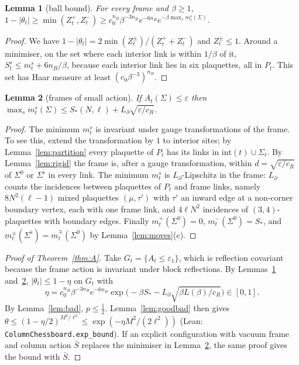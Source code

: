 \documentclass[11pt,a4paper]{article}
\newtheorem{lemma}{Lemma}[section]
\theoremstyle{definition}
\theoremstyle{remark}
\newcommand{\code}[1]{\texttt{#1}}
\begin{document}
\begin{lemma}[ball bound]\label{lem:ball}
For every frame and $\beta\ge1$, $1-|\theta_t|\ge\min(Z^+_t,Z^-_t)\ge c_0^{n_B}\beta^{-3n_B}e^{-6n_B}e^{-\beta\max_sm^s_t(\Sigma)}$.
\end{lemma}
\begin{proof}
We have $1-|\theta_t|=2\min(Z^\pm_t)/(Z^+_t+Z^-_t)$ and $Z^\pm_t\le1$.
Around a minimiser, on the set where each interior link is within $1/\beta$ of it, $S^s_t\le m^s_t+6n_B/\beta$, because each interior link lies in six plaquettes, all in $P_t$.
This set has Haar measure at least $(c_0\beta^{-3})^{n_B}$.
\end{proof}

\begin{lemma}[frames of small action]\label{lem:good}
If $A_t(\Sigma)\le\varepsilon$ then $\max_sm^s_t(\Sigma)\le S_*(N,\ell)+L_\partial\sqrt{\varepsilon/c_R}$.
\end{lemma}
\begin{proof}
The minimum $m^s_t$ is invariant under gauge transformations of the frame.
To see this, extend the transformation by $1$ to interior sites; by Lemma~\ref{lem:partition} every plaquette of $P_t$ has its links in $\mathrm{int}(t)\cup\Sigma_t$.
By Lemma~\ref{lem:rigid} the frame is, after a gauge transformation, within $d=\sqrt{\varepsilon/c_R}$ of $\Sigma^0$ or $\Sigma^\flat$ in every link.
The minimum $m^s_t$ is $L_\partial$-Lipschitz in the frame: $L_\partial$ counts the incidences between plaquettes of $P_t$ and frame links, namely $8N^2(\ell-1)$ mixed plaquettes $(\mu,\tau')$ with $\tau'$ an inward edge at a non-corner boundary vertex, each with one frame link, and $4\ell N^2$ incidences of $(3,4)$-plaquettes with boundary edges.
Finally $m^+_t(\Sigma^0)=0$, $m^-_t(\Sigma^0)=S_*$, and $m^\pm_t(\Sigma^\flat)=m^\mp_t(\Sigma^0)$ by Lemma~\ref{lem:moves}(c).
\end{proof}

\begin{proof}[Proof of Theorem~\ref{thm:A}]
Take $G_t=\{A_t\le\varepsilon_1\}$, which is reflection covariant because the frame action is invariant under block reflections. By Lemmas~\ref{lem:ball} and~\ref{lem:good}, $|\theta_t|\le1-\eta$ on $G_t$ with
\[ \eta=c_0^{n_B}\beta^{-3n_B}e^{-6n_B}\exp\big(-\beta S_*-L_\partial\sqrt{\beta L(\beta)/c_R}\big)\in[0,1]. \]
By Lemma~\ref{lem:bad}, $p\le\frac12$.
Lemma~\ref{lem:goodbad} then gives $\theta\le(1-\eta/2)^{M^2/\ell^2}\le\exp(-\eta M^2/(2\ell^2))$ (Lean: \code{ColumnChessboard.exp\_bound}). If an explicit configuration with vacuum frame and column action $\bar S$ replaces the minimiser in Lemma~\ref{lem:good}, the same proof gives the bound with $\bar S$.
\end{proof}
\end{document}
